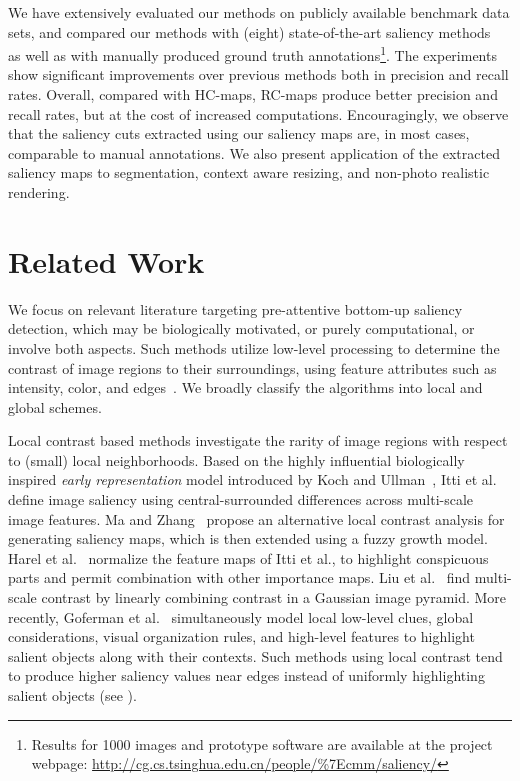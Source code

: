 \documentclass[final]{cvpr}
\newcommand{\RC}{RC-maps }
\begin{document}
We have extensively evaluated our methods on publicly available benchmark data sets, and compared
our methods with (eight) state-of-the-art saliency methods
~\cite{98pami/Itti,03ACMMM/Ma_Contrast-based,06acmmm/ZhaiS_spatiotemporal,conf/nips/HarelKP06,07cvpr/hou_SpectralResidual,08cvs/achanta_salient,09cvpr/Achanta_FTSaliency,10cvpr/goferman_context}
as well as with manually produced ground truth annotations\footnote{Results for 1000 images and
prototype software are available at the project webpage:
\href{http://cg.cs.tsinghua.edu.cn/people/~cmm/saliency/}{http://cg.cs.tsinghua.edu.cn/people/\%7Ecmm/saliency/}}.
%
The experiments show significant improvements over previous methods both in precision and recall rates.
%
Overall, compared with HC-maps, \RC produce better precision and recall rates, but at the cost
of increased computations. Encouragingly, we observe that the saliency cuts extracted
using our saliency maps are, in most cases, comparable to manual annotations.
%
We also present application of the extracted saliency maps to segmentation,
context aware resizing, and non-photo realistic rendering.




\section{Related Work}
\label{sec:RelatedWorks}

We focus on relevant literature targeting pre-attentive bottom-up saliency detection,
which may be biologically motivated, or purely computational, or involve both aspects.
%
Such methods utilize low-level processing to determine the contrast of image regions to their surroundings,
using feature attributes such as intensity, color, and edges~\cite{09cvpr/Achanta_FTSaliency}.
%
We broadly classify the algorithms into local and global schemes.


Local contrast based methods investigate the rarity of image regions with respect to (small) local neighborhoods.
%
Based on the highly influential biologically inspired \emph{early representation} model introduced
by Koch and Ullman~\cite{85HN/KochVisualAttention}, Itti et al.~\cite{98pami/Itti} define image
saliency using central-surrounded differences across multi-scale image features.
%
Ma and Zhang~\cite{03ACMMM/Ma_Contrast-based} propose an alternative local contrast
analysis for generating saliency maps, which is then extended using a fuzzy growth model.
%
Harel et al.~\cite{conf/nips/HarelKP06} normalize the feature maps of Itti et al., to highlight
conspicuous parts and permit combination with other importance maps.
%
Liu et al.~\cite{10pami/Liu_Learning} find multi-scale contrast by linearly combining contrast
in a Gaussian image pyramid.
%
More recently, Goferman et al.~\cite{10cvpr/goferman_context} simultaneously model local
low-level clues, global considerations, visual organization rules, and high-level
features to highlight salient objects along with their contexts.
%
Such methods using local contrast tend to produce higher saliency values near edges instead of uniformly
highlighting salient objects (see ).
\end{document}
